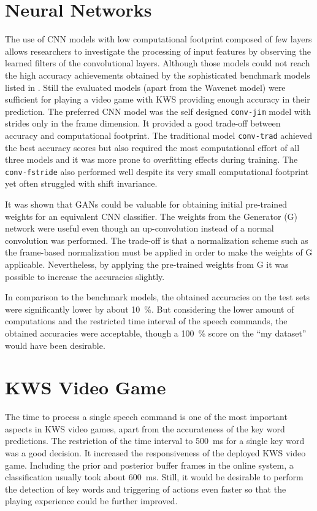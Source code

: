 \section{Neural Networks}
The use of CNN models with low computational footprint composed of few layers allows researchers to investigate the processing of input features by observing the learned filters of the convolutional layers.
Although those models could not reach the high accuracy achievements obtained by the sophisticated benchmark models listed in .
Still the evaluated models (apart from the Wavenet model) were sufficient for playing a video game with KWS providing enough accuracy in their prediction.
The preferred CNN model was the self designed \texttt{conv-jim} model with strides only in the frame dimension.
It provided a good trade-off between accuracy and computational footprint.
The traditional model \texttt{conv-trad} achieved the best accuracy scores but also required the most computational effort of all three models and it was more prone to overfitting effects during training.
The \texttt{conv-fstride} also performed well despite its very small computational footprint yet often struggled with shift invariance.

It was shown that GANs could be valuable for obtaining initial pre-trained weights for an equivalent CNN classifier.
The weights from the Generator (G) network were useful even though an up-convolution instead of a normal convolution was performed.
The trade-off is that a normalization scheme such as the frame-based normalization must be applied in order to make the weights of G applicable.
Nevertheless, by applying the pre-trained weights from G it was possible to increase the accuracies slightly.

In comparison to the benchmark models, the obtained accuracies on the test sets were significantly lower by about \SI{10}{\percent}.
But considering the lower amount of computations and the restricted time interval of the speech commands, the obtained accuracies were acceptable, though a \SI{100}{\percent} score on the \enquote{my dataset} would have been desirable.



\section{KWS Video Game}
The time to process a single speech command is one of the most important aspects in KWS video games, apart from the accurateness of the key word predictions.
The restriction of the time interval to \SI{500}{\milli\second} for a single key word was a good decision.
It increased the responsiveness of the deployed KWS video game.
Including the prior and posterior buffer frames in the online system, a classification usually took about \SI{600}{\milli\second}.
Still, it would be desirable to perform the detection of key words and triggering of actions even faster so that the playing experience could be further improved.

